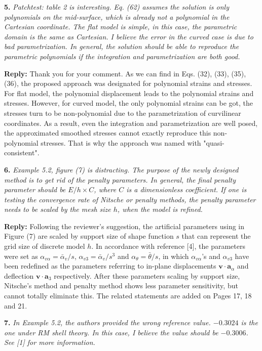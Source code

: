 \documentclass{article}
\begin{document}
\textbf{5.} \textit{Patchtest: table 2 is interesting. Eq. (62) assumes the solution is only polynomials on the mid-surface, which is already not a polynomial in the Cartesian coordinate. The flat model is simple, in this case, the parametric domain is the same as Cartesian. I believe the error in the curved case is due to bad parametrization. In general, the solution should be able to reproduce the parametric polynomials if the integration and parametrization are both good.}

\textbf{Reply:} Thank you for your comment. As we can find in Eqs. (32), (33), (35), (36),  the proposed approach was designated for polynomial strains and stresses. For flat model, the polynomial displacement leads to the polynomial strains and stresses. However, for curved model, the only polynomial strains can be got, the stresses turn to be non-polynomial due to the parametrization of curvilinear coordinates. As a result, even the integration and parametrization are well posed, the approximated smoothed stresses cannot exactly reproduce this non-polynomial stresses. That is why the approach was named with "quasi-consistent".
 
\textbf{6.} \textit{Example 5.2, figure (7) is distracting. The purpose of the newly designed method is to get rid of the penalty parameters. In general, the final penalty parameter should be $E/h\times C$, where $C$ is a dimensionless coefficient. If one is testing the convergence rate of Nitsche or penalty methods, the penalty parameter needs to be scaled by the mesh size $h$, when the model is refined.}

\textbf{Reply:} Following the reviewer's suggestion, the artificial parameters using in Figure (7) are scaled by support size of shape function $s$ that can represent the grid size of discrete model $h$. In accordance with reference [4], the parameters were set as $\alpha_{v\alpha} = \bar\alpha_v / s$, $\alpha_{v3} = \bar\alpha_v / s^3$ and $\alpha_\theta = \bar \theta / s$, in which $\alpha_{v\alpha}$'s and $\alpha_{v3}$ have been redefined as the parameters referring to in-plane displacements $\boldsymbol v \cdot \boldsymbol a_\alpha$ and deflection $\boldsymbol v \cdot \boldsymbol a_3$ respectively. After these parameters scaling by support size, Nitsche's method and penalty method shows less parameter sensitivity, but cannot totally eliminate this. The related statements are added on Pages 17, 18 and 21.

\textbf{7.} \textit{In Example 5.2, the authors provided the wrong reference value. $-0.3024$ is the one under RM shell theory. In this case, I believe the value should be $-0.3006$. See [1] for more information.}
\end{document}
